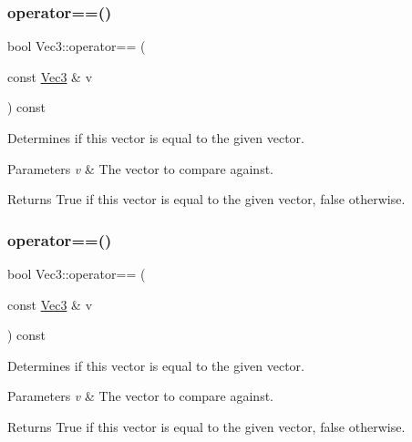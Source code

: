 \subsubsection{\texorpdfstring{operator==()}{operator==()}\hspace{0.1cm}{\footnotesize\ttfamily [1/2]}}
{\footnotesize\ttfamily bool Vec3\+::operator== (\begin{DoxyParamCaption}\item[{const \hyperlink{classVec3}{Vec3} \&}]{v }\end{DoxyParamCaption}) const\hspace{0.3cm}{\ttfamily [inline]}}

Determines if this vector is equal to the given vector.


\begin{DoxyParams}{Parameters}
{\em v} & The vector to compare against.\\
\hline
\end{DoxyParams}
\begin{DoxyReturn}{Returns}
True if this vector is equal to the given vector, false otherwise. 
\end{DoxyReturn}
\mbox{\label{classVec3_a9316a906e2b490aa9405bc17adc0078c}} 
\subsubsection{\texorpdfstring{operator==()}{operator==()}\hspace{0.1cm}{\footnotesize\ttfamily [2/2]}}
{\footnotesize\ttfamily bool Vec3\+::operator== (\begin{DoxyParamCaption}\item[{const \hyperlink{classVec3}{Vec3} \&}]{v }\end{DoxyParamCaption}) const\hspace{0.3cm}{\ttfamily [inline]}}

Determines if this vector is equal to the given vector.


\begin{DoxyParams}{Parameters}
{\em v} & The vector to compare against.\\
\hline
\end{DoxyParams}
\begin{DoxyReturn}{Returns}
True if this vector is equal to the given vector, false otherwise. 
\end{DoxyReturn}
\mbox{\label{classVec3_a0dda78fca14e8888aa753ad5a5ae9980}} 
